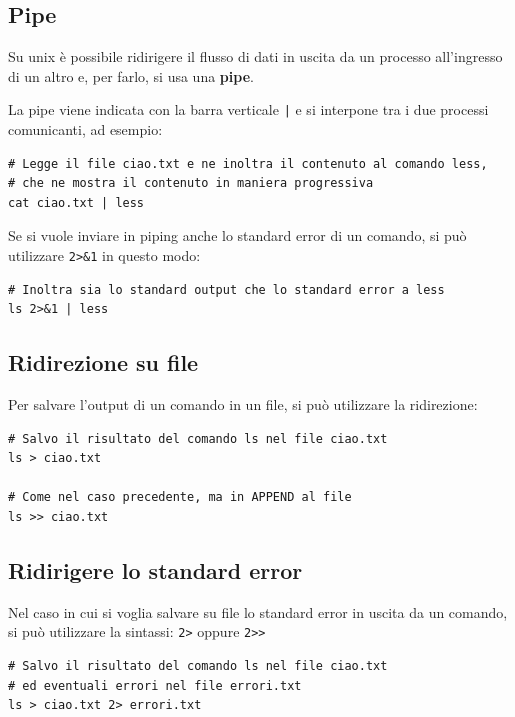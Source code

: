 \documentclass[a4paper]{report}
\newenvironment{info}{\begin{tcolorbox}[fonttitle=\sffamily\bfseries\large,title=Info,colframe=blue!75!white]}{\end{tcolorbox}}
\newenvironment{code}{\begin{tcolorbox}[size=small]}{\end{tcolorbox}}
\begin{document}
\subsection{Pipe}

Su unix è possibile ridirigere il flusso di dati in uscita da un processo all'ingresso di un altro e, per farlo, si usa una \textbf{pipe}.

La pipe viene indicata con la barra verticale \texttt{|} e si interpone tra i due processi comunicanti, ad esempio:

\begin{code}
\begin{lstlisting}
# Legge il file ciao.txt e ne inoltra il contenuto al comando less,
# che ne mostra il contenuto in maniera progressiva
cat ciao.txt | less
\end{lstlisting}
\end{code}

\begin{info}
	Se si vuole inviare in piping anche lo standard error di un comando, si può utilizzare \texttt{2>\&1} in questo modo:
	\begin{lstlisting}
# Inoltra sia lo standard output che lo standard error a less
ls 2>&1 | less
	\end{lstlisting}
\end{info}

\subsection{Ridirezione su file}
Per salvare l'output di un comando in un file, si può utilizzare la ridirezione:
\begin{code}
\begin{lstlisting}
# Salvo il risultato del comando ls nel file ciao.txt
ls > ciao.txt

# Come nel caso precedente, ma in APPEND al file
ls >> ciao.txt
\end{lstlisting}
\end{code}

\subsection{Ridirigere lo standard error}

Nel caso in cui si voglia salvare su file lo standard error in uscita da un comando, si può utilizzare la sintassi: \texttt{2>} oppure \texttt{2>>}
\begin{code}
\begin{lstlisting}
# Salvo il risultato del comando ls nel file ciao.txt
# ed eventuali errori nel file errori.txt
ls > ciao.txt 2> errori.txt
\end{lstlisting}
\end{code}
\end{document}
